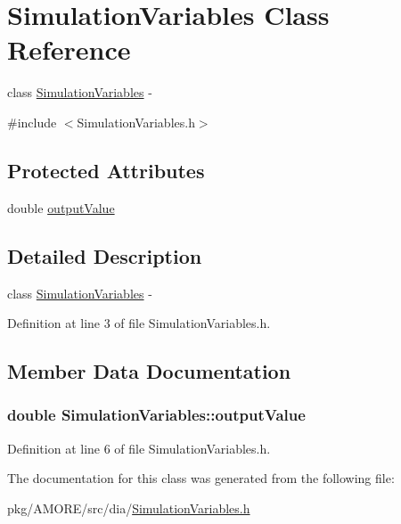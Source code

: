\hypertarget{class_simulation_variables}{
\section{SimulationVariables Class Reference}
\label{class_simulation_variables}
}


class \hyperlink{class_simulation_variables}{SimulationVariables} -\/  




{\ttfamily \#include $<$SimulationVariables.h$>$}

\subsection*{Protected Attributes}
\begin{DoxyCompactItemize}
\item 
double \hyperlink{class_simulation_variables_a080d07f80188b991bd01bec64b92f2ae}{outputValue}
\end{DoxyCompactItemize}


\subsection{Detailed Description}
class \hyperlink{class_simulation_variables}{SimulationVariables} -\/ 

Definition at line 3 of file SimulationVariables.h.



\subsection{Member Data Documentation}
\hypertarget{class_simulation_variables_a080d07f80188b991bd01bec64b92f2ae}{
\subsubsection[{outputValue}]{\setlength{\rightskip}{0pt plus 5cm}double {\bf SimulationVariables::outputValue}}}
\label{class_simulation_variables_a080d07f80188b991bd01bec64b92f2ae}


Definition at line 6 of file SimulationVariables.h.



The documentation for this class was generated from the following file:\begin{DoxyCompactItemize}
\item 
pkg/AMORE/src/dia/\hyperlink{_simulation_variables_8h}{SimulationVariables.h}\end{DoxyCompactItemize}
